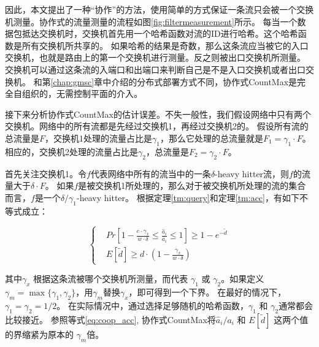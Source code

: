 因此，本文提出了一种“协作”的方法，使用简单的方式保证一条流只会被一个交换机测量。协作式的流量测量的流程如图\ref{fig:filtermeasurement}所示。
每当一个数据包抵达交换机时，交换机首先用一个哈希函数对流的ID进行哈希。这个哈希函数是所有交换机所共享的。
如果哈希的结果是奇数，那么这条流应当被它的入口交换机，也就是路由上的第一个交换机进行测量。反之则被出口交换机所测量。
交换机可以通过这条流的入端口和出端口来判断自己是不是入口交换机或者出口交换机。
和第\ref{chap:gmsc}章中介绍的分布式部署方式不同，协作式CountMax是完全自组织的，无需控制平面的介入。

接下来分析协作式CountMax的估计误差。不失一般性，我们假设网络中只有两个交换机。网络中的所有流都是先经过交换机1，再经过交换机2的。
假设所有流的总流量是$F$，交换机1处理的流量占比是$\gamma_1 $，那么它处理的总流量就是$F_1 =\gamma_1\cdot F $。
相应的，交换机2处理的流量占比是$\gamma_2 $，总流量是$F_2 =\gamma_2\cdot F $。

首先关注交换机1。令$f$代表网络中所有的流当中的一条$\delta$-heavy hitter流，则$f$的流量大于$\delta \cdot F$。
如果$f$是被交换机1所处理的，那么对于被交换机所处理的流的集合而言，$f$是一个$\delta/\gamma_1$-heavy hitter。
根据定理\ref{tm:query}和定理\ref{tm:acc}，有如下不等式成立：

\begin{equation}\label{eq:coop_acc}
\left\{
\begin{aligned}
&Pr[1-\frac{e\cdot \gamma_x}{w\cdot \delta}\le \frac{\hat{a}_i}{a_i} \le 1] \ge 1-e^{-\tilde{d}}\\
&E[\tilde{d}]\ge d\cdot(1-\frac{\gamma_x}{w\cdot\delta})
\end{aligned}
\right.
\end{equation}

其中$\gamma_x$ 根据这条流被哪个交换机所测量，而代表 $\gamma_1$ 或 $\gamma_2$。如果定义 $\gamma_m = \max \{\gamma_1, \gamma_2\}$，用$\gamma_m$替换$\gamma_x$，即可得到一个下界。
在最好的情况下，$\gamma_1=\gamma_2=1/2$。
在实际情况中，通过选择足够随机的哈希函数，$\gamma_1$ 和 $\gamma_2$通常都会比较接近。
参照等式\eqref{eq:coop_acc}, 协作式CountMax将$\hat{a}_i/a_i$ 和 $E[\tilde{d}]$ 这两个值的界缩紧为原本的 $\gamma_m $倍。
